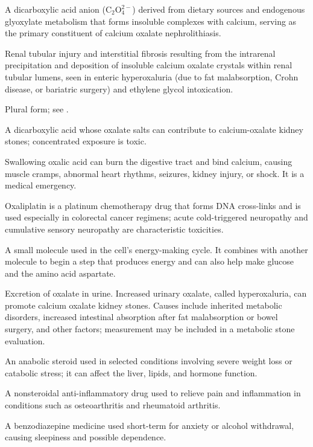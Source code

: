  A dicarboxylic acid anion ($\text{C}_2\text{O}_4^{2-}$) derived from dietary sources and endogenous glyoxylate metabolism that forms insoluble complexes with calcium, serving as the primary constituent of calcium oxalate nephrolithiasis.

 Renal tubular injury and interstitial fibrosis resulting from the intrarenal precipitation and deposition of insoluble calcium oxalate crystals within renal tubular lumens, seen in enteric hyperoxaluria (due to fat malabsorption, Crohn disease, or bariatric surgery) and ethylene glycol intoxication.

 Plural form; see .

 A dicarboxylic acid whose oxalate salts can contribute to calcium-oxalate kidney stones; concentrated exposure is toxic.

 Swallowing oxalic acid can burn the digestive tract and bind calcium, causing muscle cramps, abnormal heart rhythms, seizures, kidney injury, or shock. It is a medical emergency.

 Oxaliplatin is a platinum chemotherapy drug that forms DNA cross-links and is used especially in colorectal cancer regimens; acute cold-triggered neuropathy and cumulative sensory neuropathy are characteristic toxicities.

 A small molecule used in the cell’s energy-making cycle. It combines with another molecule to begin a step that produces energy and can also help make glucose and the amino acid aspartate.

 Excretion of oxalate in urine. Increased urinary oxalate, called
hyperoxaluria, can promote calcium oxalate kidney stones. Causes include inherited
metabolic disorders, increased intestinal absorption after fat malabsorption or bowel
surgery, and other factors; measurement may be included in a metabolic stone evaluation.

 An anabolic steroid used in selected conditions involving severe weight loss or catabolic stress; it can affect the liver, lipids, and hormone function.

 A nonsteroidal anti-inflammatory drug used to relieve pain and inflammation in conditions such as osteoarthritis and rheumatoid arthritis.

 A benzodiazepine medicine used short-term for anxiety or alcohol withdrawal, causing sleepiness and possible dependence.

